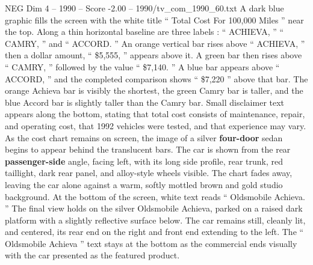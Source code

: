 \begin{textsample}{NEG Dim 4 – 1990 – Score -2.00 – 1990/tv\_com\_1990\_60.txt}  \label{ex:f4_neg_024}
A dark blue graphic fills the screen with the white title “ Total Cost For 100,000 Miles ” near the top.
Along a thin horizontal baseline are three labels : “ ACHIEVA, ” “ CAMRY, ” and “ ACCORD. ” An orange vertical bar rises above “ ACHIEVA, ” then a dollar amount, “ \$5,555, ” appears above it.
A green bar then rises above “ CAMRY, ” followed by the value “ \$7,140. ” A blue bar appears above “ ACCORD, ” and the completed comparison shows “ \$7,220 ” above that bar.
The orange Achieva bar is visibly the shortest, the green Camry bar is taller, and the blue Accord bar is slightly taller than the Camry bar.
Small disclaimer text appears along the bottom, stating that total cost consists of maintenance, repair, and operating cost, that 1992 vehicles were tested, and that experience may vary.
As the cost chart remains on screen, the image of a silver \textbf{four-door} sedan begins to appear behind the translucent bars.
The car is shown from the rear \textbf{passenger-side} angle, facing left, with its long side profile, rear trunk, red taillight, dark rear panel, and alloy-style wheels visible.
The chart fades away, leaving the car alone against a warm, softly mottled brown and gold studio background.
At the bottom of the screen, white text reads “ Oldsmobile Achieva. ” The final view holds on the silver Oldsmobile Achieva, parked on a raised dark platform with a slightly reflective surface below.
The car remains still, cleanly lit, and centered, its rear end on the right and front end extending to the left.
The “ Oldsmobile Achieva ” text stays at the bottom as the commercial ends visually with the car presented as the featured product.

\end{textsample}
